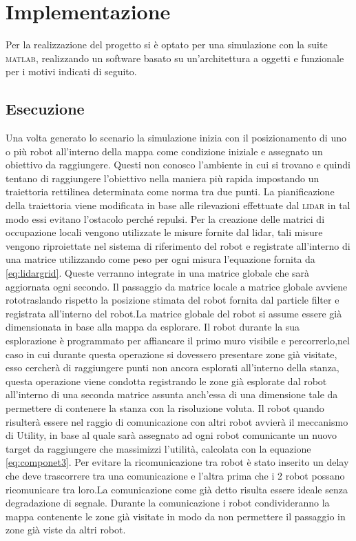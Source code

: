 \section{Implementazione}
\label{sec:implementazione}
Per la realizzazione del progetto si è optato per una simulazione con la suite
\textsc{matlab}, realizzando un software basato su un'architettura a oggetti
e funzionale per i motivi indicati di seguito.
\subsection{Esecuzione}
Una volta generato lo scenario la simulazione inizia con il posizionamento di
uno o più robot all'interno della mappa come condizione iniziale e assegnato un
obiettivo da raggiungere.
Questi non conosco l'ambiente in cui si trovano e quindi tentano di raggiungere
l'obiettivo nella maniera più rapida impostando un traiettoria rettilinea
determinata come norma tra due punti.
La pianificazione della traiettoria viene modificata in base alle rilevazioni
effettuate dal \textsc{lidar} in tal modo essi evitano l'ostacolo perché repulsi.
Per la creazione delle matrici di occupazione locali vengono utilizzate le misure
fornite dal lidar, tali misure vengono riproiettate nel sistema di riferimento del robot
e registrate all'interno di una matrice utilizzando come peso per ogni misura l'equazione
fornita da \eqref{eq:lidargrid}.
Queste verranno integrate in una matrice globale che sarà aggiornata ogni secondo. Il
passaggio da matrice locale a matrice globale avviene rototraslando rispetto la posizione
stimata del robot fornita dal particle filter e registrata all'interno del robot.La matrice
globale del robot si assume essere già dimensionata in base alla mappa da esplorare.
Il robot durante la sua esplorazione è programmato per affiancare il primo muro visibile e
percorrerlo,nel caso in cui durante questa operazione si dovessero presentare zone già visitate,
esso cercherà di raggiungere punti non ancora esplorati all'interno della stanza, questa operazione
viene condotta registrando le zone già esplorate dal robot all'interno di una seconda matrice assunta
anch'essa di una dimensione tale da permettere di contenere la stanza con la risoluzione voluta.
Il robot quando risulterà essere nel raggio di comunicazione con altri robot avvierà il meccanismo di Utility,
in base al quale sarà assegnato ad ogni robot comunicante un nuovo target da raggiungere che massimizzi
l'utilità, calcolata con la equazione \eqref{eq:componet3}. Per evitare la ricomunicazione tra robot è stato
inserito un delay che deve trascorrere tra una comunicazione e l'altra prima che i 2 robot possano ricomunicare
tra loro.La comunicazione come già detto risulta essere ideale senza degradazione di segnale.
Durante la comunicazione i robot condivideranno la mappa contenente le zone già visitate in modo da
non permettere il passaggio in zone già viste da altri robot.
%


